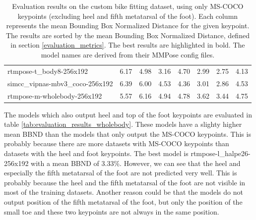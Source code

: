 \begin{table}[htbp]
\begin{tabular}{l ccccccc}
        rtmpose-t\_body8-256x192         & 6.17           & 4.98          & 3.16          & 4.70              & 2.99           & 2.75           & 4.13          \\
        simcc\_vipnas-mbv3\_coco-256x192 & 6.39           & 6.00          & 4.53          & 4.36              & 3.01           & 2.86           & 4.53          \\
        rtmpose-m-wholebody-256x192      & 5.57           & 6.16          & 4.94          & 4.78              & 3.62           & 3.44           & 4.75          \\
        \bottomrule
    \end{tabular}
    \caption{Evaluation results on the custom bike fitting dataset, using only MS-COCO keypoints (excluding heel and fifth metatarsal of the foot). Each column represents the mean Bounding Box Normalized Distance for the given keypoint. The results are sorted by the mean Bounding Box Normalized Distance, defined in section \ref{evaluation_metrics}. The best results are highlighted in bold. The model names are derived from their MMPose config files.}
    \label{tab:evaluation_results_coco}

\end{table}

The models which also output heel and top of the foot keypoints are evaluated in table \ref{tab:evaluation_results_wholebody}. These models have a slighty higher mean BBND than the models that only output the MS-COCO keypoints. This is probably because there are more datasets with MS-COCO keypoints than datasets with the heel and foot keypoints. The best model is rtmpose-l\_halpe26-256x192 with a mean BBND of 3.33\%. However, we can see that the heel and especially the fifth metatarsal of the foot are not predicted very well. This is probably because the heel and the fifth metatarsal of the foot are not visible in most of the training datasets. Another reason could be that the models do not output position of the fifth metatarsal of the foot, but only the position of the small toe and these two keypoints are not always in the same position.

